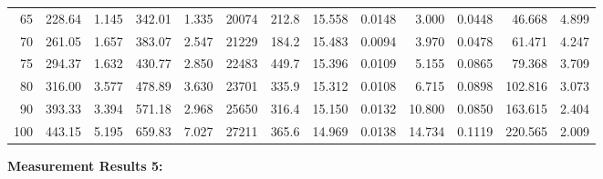 \documentclass[10pt]{article}
\begin{document}
{\begin{tabular}{|r|rr|rr|rr|rr|rr|r|r|}
       65 &       228.64 &        1.145 &       342.01 &        1.335 &        20074 &        212.8 &       15.558 &       0.0148 &        3.000 &       0.0448 &       46.668 &        4.899 \\
       70 &       261.05 &        1.657 &       383.07 &        2.547 &        21229 &        184.2 &       15.483 &       0.0094 &        3.970 &       0.0478 &       61.471 &        4.247 \\
       75 &       294.37 &        1.632 &       430.77 &        2.850 &        22483 &        449.7 &       15.396 &       0.0109 &        5.155 &       0.0865 &       79.368 &        3.709 \\
       80 &       316.00 &        3.577 &       478.89 &        3.630 &        23701 &        335.9 &       15.312 &       0.0108 &        6.715 &       0.0898 &      102.816 &        3.073 \\
       90 &       393.33 &        3.394 &       571.18 &        2.968 &        25650 &        316.4 &       15.150 &       0.0132 &       10.800 &       0.0850 &      163.615 &        2.404 \\
      100 &       443.15 &        5.195 &       659.83 &        7.027 &        27211 &        365.6 &       14.969 &       0.0138 &       14.734 &       0.1119 &      220.565 &        2.009 \\
\hline
\end{tabular}
}

\vspace{3mm}

\noindent
{\large \bf Measurement Results 5:}
\vspace{3mm}
\end{document}
